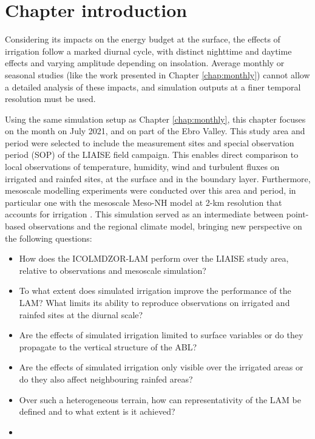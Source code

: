 \section{Chapter introduction}

Considering its impacts on the energy budget at the surface, the effects of irrigation follow a marked diurnal cycle, with distinct nighttime and daytime effects and varying amplitude depending on insolation. 
Average monthly or seasonal studies (like the work presented in Chapter \ref{chap:monthly}) cannot allow a detailed analysis of these impacts, and simulation outputs at a finer temporal resolution must be used.

Using the same simulation setup as Chapter \ref{chap:monthly}, this chapter focuses on the month on July 2021, and on part of the Ebro Valley. This study area and period were selected to include the measurement sites and special observation period (SOP) of the LIAISE field campaign. This enables direct comparison to local observations of temperature, humidity, wind and turbulent fluxes on irrigated and rainfed sites, at the surface and in the boundary layer. Furthermore, mesoscale modelling experiments were conducted over this area and period, in particular one with the mesoscale Meso-NH model at 2-km resolution that accounts for irrigation \citep{lunel_irrigation_2024}. This simulation served as an intermediate between point-based observations and the regional climate model, bringing new perspective on the following questions:

\begin{itemize}
    \item How does the ICOLMDZOR-LAM perform over the LIAISE study area, relative to observations and mesoscale simulation?
    \item To what extent does simulated irrigation improve the performance of the LAM? What limits its ability to reproduce observations on irrigated and rainfed sites at the diurnal scale?
    \item Are the effects of simulated irrigation limited to surface variables or do they propagate to the vertical structure of the ABL? 
    \item Are the effects of simulated irrigation only visible over the irrigated areas or do they also affect neighbouring rainfed areas?
    \item Over such a heterogeneous terrain, how can representativity of the LAM be defined and to what extent is it achieved?
    \item %
\end{itemize}

